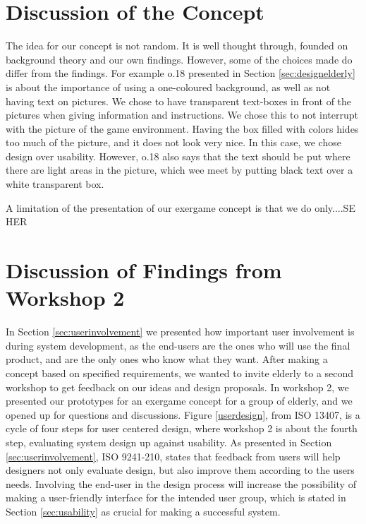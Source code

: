 \section{Discussion of the Concept}
\label{sec:discconcept}
The idea for our concept is not random. It is well thought through, founded on background theory and our own findings. However, some of the choices made do differ from the findings. For example o.18 presented in Section \ref{sec:designelderly} is about the importance of using a one-coloured background, as well as not having text on pictures. We chose to have transparent text-boxes in front of the pictures when giving information and instructions. We chose this to not interrupt with the picture of the game environment. Having the box filled with colors hides too much of the picture, and it does not look very nice. In this case, we chose design over usability. However, o.18 also says that the text should be put where there are light areas in the picture, which wee meet by putting black text over a white transparent box.    

A limitation of the presentation of our exergame concept is that we do only....SE HER


\section{Discussion of Findings from Workshop 2}
\label{sec:discfindings2}
In Section \ref{sec:userinvolvement} we presented how important user involvement is during system development, as the end-users are the ones who will use the final product, and are the only ones who know what they want. After making a concept based on specified requirements, we wanted to invite elderly to a second workshop to get feedback on our ideas and design proposals. In workshop 2, we presented our prototypes for an exergame concept for a group of elderly, and we opened up for questions and discussions. Figure \ref{userdesign}, from ISO 13407, is a cycle of four steps for user centered design, where workshop 2 is about the fourth step, evaluating system design up against usability. As presented in Section \ref{sec:userinvolvement}, ISO 9241-210, states that feedback from users will help designers not only evaluate design, but also improve them according to the users needs. Involving the end-user in the design process will increase the possibility of making a user-friendly interface for the intended user group, which is stated in Section \ref{sec:usability} as crucial for making a successful system. 

